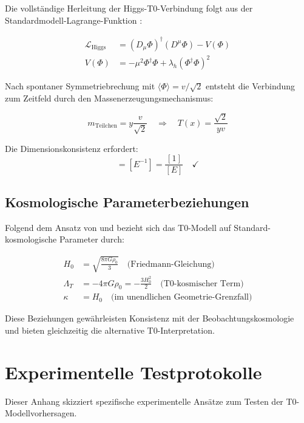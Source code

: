 \documentclass[12pt,a4paper]{article}
\begin{document}
	Die vollständige Herleitung der Higgs-T0-Verbindung folgt aus der Standardmodell-Lagrange-Funktion \citep{weinberg2003,peskin1995}:
	
	\begin{align}
		\mathcal{L}_{\text{Higgs}} &= (D_\mu \Phi)^\dagger (D^\mu \Phi) - V(\Phi) \\
		V(\Phi) &= -\mu^2 \Phi^\dagger \Phi + \lambda_h (\Phi^\dagger \Phi)^2
	\end{align}
	
	Nach spontaner Symmetriebrechung mit $\langle\Phi\rangle = v/\sqrt{2}$ entsteht die Verbindung zum Zeitfeld durch den Massenerzeugungsmechanismus:
	
	\begin{equation}
		m_{\text{Teilchen}} = y \frac{v}{\sqrt{2}} \quad \Rightarrow \quad T(x) = \frac{\sqrt{2}}{y v}
	\end{equation}
	
	Die Dimensionskonsistenz erfordert:
	\begin{equation}
		[T(x)] = [E^{-1}] = \frac{[1]}{[E]} \quad \checkmark
	\end{equation}
	
	\subsection{Kosmologische Parameterbeziehungen}
	\label{app:cosmological_parameters}
	
	Folgend dem Ansatz von \citet{weinberg2008} und \citet{peebles1993} bezieht sich das T0-Modell auf Standard-kosmologische Parameter durch:
	
	\begin{align}
		H_0 &= \sqrt{\frac{8\pi G \rho_0}{3}} \quad \text{(Friedmann-Gleichung)} \\
		\Lambda_T &= -4\pi G \rho_0 = -\frac{3 H_0^2}{2} \quad \text{(T0-kosmischer Term)} \\
		\kappa &= H_0 \quad \text{(im unendlichen Geometrie-Grenzfall)}
	\end{align}
	
	Diese Beziehungen gewährleisten Konsistenz mit der Beobachtungskosmologie und bieten gleichzeitig die alternative T0-Interpretation.
	
	\section{Experimentelle Testprotokolle}
	\label{app:experimental_protocols}
	
	Dieser Anhang skizziert spezifische experimentelle Ansätze zum Testen der T0-Modellvorhersagen.
	
\end{document}
